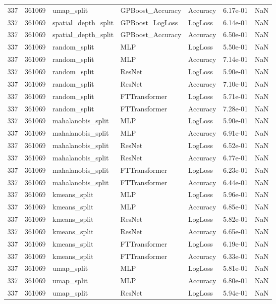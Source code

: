 \begin{tabular}{rrlllrr}
337 & 361069 & umap\_split & GPBoost\_Accuracy & Accuracy & 6.17e-01 & NaN \\
337 & 361069 & spatial\_depth\_split & GPBoost\_LogLoss & LogLoss & 6.14e-01 & NaN \\
337 & 361069 & spatial\_depth\_split & GPBoost\_Accuracy & Accuracy & 6.50e-01 & NaN \\
337 & 361069 & random\_split & MLP & LogLoss & 5.50e-01 & NaN \\
337 & 361069 & random\_split & MLP & Accuracy & 7.14e-01 & NaN \\
337 & 361069 & random\_split & ResNet & LogLoss & 5.90e-01 & NaN \\
337 & 361069 & random\_split & ResNet & Accuracy & 7.10e-01 & NaN \\
337 & 361069 & random\_split & FTTransformer & LogLoss & 5.71e-01 & NaN \\
337 & 361069 & random\_split & FTTransformer & Accuracy & 7.28e-01 & NaN \\
337 & 361069 & mahalanobis\_split & MLP & LogLoss & 5.90e-01 & NaN \\
337 & 361069 & mahalanobis\_split & MLP & Accuracy & 6.91e-01 & NaN \\
337 & 361069 & mahalanobis\_split & ResNet & LogLoss & 6.52e-01 & NaN \\
337 & 361069 & mahalanobis\_split & ResNet & Accuracy & 6.77e-01 & NaN \\
337 & 361069 & mahalanobis\_split & FTTransformer & LogLoss & 6.23e-01 & NaN \\
337 & 361069 & mahalanobis\_split & FTTransformer & Accuracy & 6.44e-01 & NaN \\
337 & 361069 & kmeans\_split & MLP & LogLoss & 5.96e-01 & NaN \\
337 & 361069 & kmeans\_split & MLP & Accuracy & 6.85e-01 & NaN \\
337 & 361069 & kmeans\_split & ResNet & LogLoss & 5.82e-01 & NaN \\
337 & 361069 & kmeans\_split & ResNet & Accuracy & 6.65e-01 & NaN \\
337 & 361069 & kmeans\_split & FTTransformer & LogLoss & 6.19e-01 & NaN \\
337 & 361069 & kmeans\_split & FTTransformer & Accuracy & 6.33e-01 & NaN \\
337 & 361069 & umap\_split & MLP & LogLoss & 5.81e-01 & NaN \\
337 & 361069 & umap\_split & MLP & Accuracy & 6.80e-01 & NaN \\
337 & 361069 & umap\_split & ResNet & LogLoss & 5.94e-01 & NaN \\

\end{tabular}
